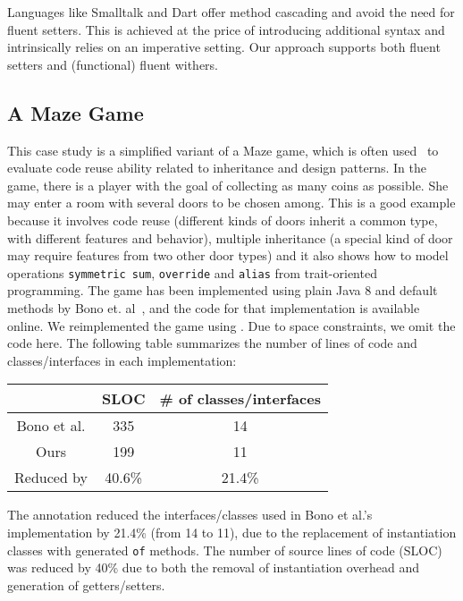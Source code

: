 
Languages like Smalltalk and Dart offer method cascading and avoid the need for fluent setters.
This is achieved at the price of introducing additional syntax and 
intrinsically relies on an imperative setting. 
Our approach supports both fluent setters and (functional) 
fluent withers.

\subsection{A Maze Game}
This case study is a simplified variant of a Maze game, which is often
used~\cite{gof,bono14}
to evaluate code reuse ability related to inheritance and design
patterns. In the game, there is a player with the goal of collecting
as many coins as possible. She may enter a room with several doors to
be chosen among. This is a good example because it involves code reuse
(different kinds of doors inherit a common type, with different
features and behavior), multiple inheritance (a special kind of door
may require features from two other door types) and it also shows how
to model operations \texttt{symmetric sum}, \texttt{override} and
\texttt{alias} from trait-oriented programming. The game has been
implemented using plain Java 8 and default methods by Bono
et. al~\cite{bono14}, and the code for that implementation is
available online. We reimplemented the game using \mixin. Due to space
constraints, we omit the code here. The following table summarizes
the number of lines of code and classes/interfaces in each implementation:

\vspace{5pt}
{\fontsize{8}{10}\selectfont
\begin{tabular}{ccc}
\hline \rowcolor[HTML]{C0C0C0}
            & SLOC   & \# of classes/interfaces \\ \hline
Bono et al. & 335    & 14                       \\
Ours        & 199    & 11                       \\
\rowcolor[HTML]{C0C0C0}
Reduced by  & 40.6\% & 21.4\%                   \\ \hline
\end{tabular}
}
\vspace{5pt}


\noindent The \mixin annotation reduced the interfaces/classes used
in Bono et al.'s implementation by 21.4\% (from 14 to 11), due to the replacement of instantiation classes with
generated \texttt{of} methods. The number of source lines of code 
(SLOC)
was reduced by 40\% due to both the removal of instantiation overhead and
generation of getters/setters. %

